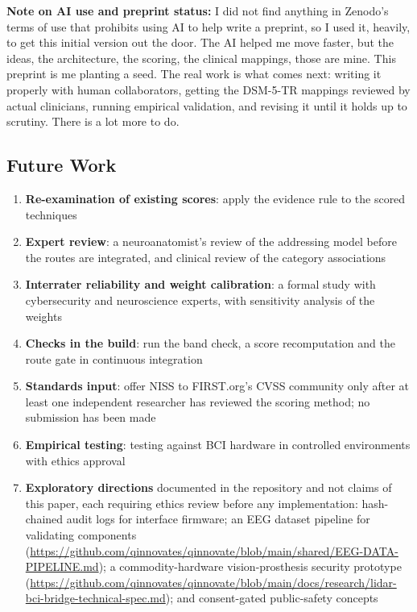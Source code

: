 \noindent\textbf{Note on AI use and preprint status:} I did not find anything
in Zenodo's terms of use that prohibits using AI to help write a preprint, so
I used it, heavily, to get this initial version out the door. The AI helped
me move faster, but the ideas, the architecture, the scoring, the clinical
mappings, those are mine. This preprint is me planting a seed. The real work
is what comes next: writing it properly with human collaborators, getting the
DSM-5-TR mappings reviewed by actual clinicians, running empirical validation,
and revising it until it holds up to scrutiny. There is a lot more to do.

\subsection{Future Work}

\begin{enumerate}
  \item \textbf{Re-examination of existing scores}: apply the evidence rule to the
        \LiveNissScored{} scored techniques
  \item \textbf{Expert review}: a neuroanatomist's review of the addressing model before
        the routes are integrated, and clinical review of the category associations
  \item \textbf{Interrater reliability and weight calibration}: a formal study with
        cybersecurity and neuroscience experts, with sensitivity analysis of the weights
  \item \textbf{Checks in the build}: run the band check, a score recomputation and the
        route gate in continuous integration
  \item \textbf{Standards input}: offer NISS to FIRST.org's CVSS community only after at
        least one independent researcher has reviewed the scoring method; no submission has
        been made
  \item \textbf{Empirical testing}: testing against BCI hardware in controlled environments
        with ethics approval
  \item \textbf{Exploratory directions} documented in the repository and not claims of this
        paper, each requiring ethics review before any implementation: hash-chained audit
        logs for interface firmware; an EEG dataset pipeline for validating components
        (\url{https://github.com/qinnovates/qinnovate/blob/main/shared/EEG-DATA-PIPELINE.md});
        a commodity-hardware vision-prosthesis security prototype
        (\url{https://github.com/qinnovates/qinnovate/blob/main/docs/research/lidar-bci-bridge-technical-spec.md});
        and consent-gated public-safety concepts
\end{enumerate}
